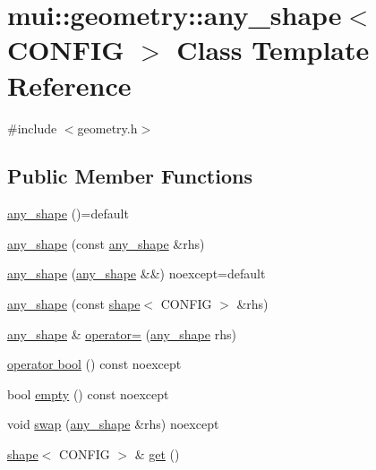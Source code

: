 \hypertarget{classmui_1_1geometry_1_1any__shape}{}\section{mui\+:\+:geometry\+:\+:any\+\_\+shape$<$ C\+O\+N\+F\+IG $>$ Class Template Reference}
\label{classmui_1_1geometry_1_1any__shape}


{\ttfamily \#include $<$geometry.\+h$>$}

\subsection*{Public Member Functions}
\begin{DoxyCompactItemize}
\item 
\hyperlink{classmui_1_1geometry_1_1any__shape_a63f34ab51f6745f1b004a251ecce6a44}{any\+\_\+shape} ()=default
\item 
\hyperlink{classmui_1_1geometry_1_1any__shape_a4992baf3b21a4e5ab73db0d7131d4cf7}{any\+\_\+shape} (const \hyperlink{classmui_1_1geometry_1_1any__shape}{any\+\_\+shape} \&rhs)
\item 
\hyperlink{classmui_1_1geometry_1_1any__shape_af9f12f87e8eb84b835392a6e03b3b9b0}{any\+\_\+shape} (\hyperlink{classmui_1_1geometry_1_1any__shape}{any\+\_\+shape} \&\&) noexcept=default
\item 
\hyperlink{classmui_1_1geometry_1_1any__shape_a9136caaea6ffd611d1aeced0cd9297dc}{any\+\_\+shape} (const \hyperlink{classmui_1_1geometry_1_1shape}{shape}$<$ C\+O\+N\+F\+IG $>$ \&rhs)
\item 
\hyperlink{classmui_1_1geometry_1_1any__shape}{any\+\_\+shape} \& \hyperlink{classmui_1_1geometry_1_1any__shape_aadfe3d85f7cb88e8940b6812122023b1}{operator=} (\hyperlink{classmui_1_1geometry_1_1any__shape}{any\+\_\+shape} rhs)
\item 
\hyperlink{classmui_1_1geometry_1_1any__shape_ac8ca4985eeda1228a465a8ee0eef743f}{operator bool} () const noexcept
\item 
bool \hyperlink{classmui_1_1geometry_1_1any__shape_a1de14e805b4b17bff9ac9456591266b4}{empty} () const noexcept
\item 
void \hyperlink{classmui_1_1geometry_1_1any__shape_a872a9094ca9513b0aa93c1a1fe5c719a}{swap} (\hyperlink{classmui_1_1geometry_1_1any__shape}{any\+\_\+shape} \&rhs) noexcept
\item 
\hyperlink{classmui_1_1geometry_1_1shape}{shape}$<$ C\+O\+N\+F\+IG $>$ \& \hyperlink{classmui_1_1geometry_1_1any__shape_a9dcdce6998e255afc8258e3d0c867577}{get} ()

\end{DoxyCompactItemize}
